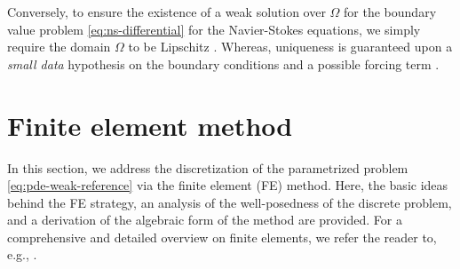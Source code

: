 \documentclass[12pt, a4paper, twoside, openright]{report}
\numberwithin{equation}{chapter}
\theoremstyle{theorem}
\theoremstyle{definition}
\theoremstyle{remark}
\theoremstyle{proposition}
\numberwithin{figure}{chapter}
\begin{document}
		Conversely, to ensure the existence of a weak solution over $\Omega$ for the boundary value problem \eqref{eq:ns-differential} for the Navier-Stokes equations, we simply require the domain $\Omega$ to be Lipschitz \cite{QMN15}. Whereas, uniqueness is guaranteed upon a \emph{small data} hypothesis on the boundary conditions and a possible forcing term \cite{ESW04}. 
		
	\section{Finite element method}
	\label{section:Finite element method}
	
		In this section, we address the discretization of the parametrized problem \eqref{eq:pde-weak-reference} via the finite element (FE) method. Here, the basic ideas behind the FE strategy, an analysis of the well-posedness of the discrete problem, and a derivation of the algebraic form of the method are provided. For a comprehensive and detailed overview on finite elements, we refer the reader to, e.g., \cite{Qua10}.
		
\end{document}
